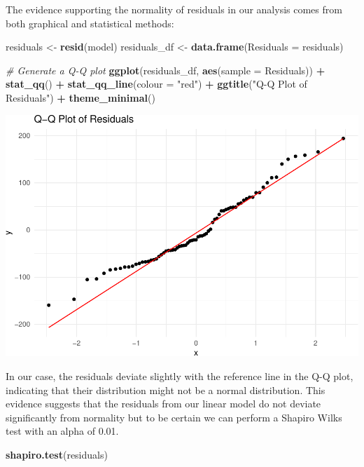 \documentclass[
]{article}
\newenvironment{Shaded}{\begin{snugshade}}{\end{snugshade}}
\newcommand{\AttributeTok}[1]{\textcolor[rgb]{0.13,0.29,0.53}{#1}}
\newcommand{\CommentTok}[1]{\textcolor[rgb]{0.56,0.35,0.01}{\textit{#1}}}
\newcommand{\FunctionTok}[1]{\textcolor[rgb]{0.13,0.29,0.53}{\textbf{#1}}}
\newcommand{\NormalTok}[1]{#1}
\newcommand{\OtherTok}[1]{\textcolor[rgb]{0.56,0.35,0.01}{#1}}
\newcommand{\SpecialCharTok}[1]{\textcolor[rgb]{0.81,0.36,0.00}{\textbf{#1}}}
\newcommand{\StringTok}[1]{\textcolor[rgb]{0.31,0.60,0.02}{#1}}
\begin{document}
The evidence supporting the normality of residuals in our analysis comes
from both graphical and statistical methods:

\begin{Shaded}
\begin{Highlighting}[]
\NormalTok{residuals }\OtherTok{\textless{}{-}} \FunctionTok{resid}\NormalTok{(model)}
\NormalTok{residuals\_df }\OtherTok{\textless{}{-}} \FunctionTok{data.frame}\NormalTok{(}\AttributeTok{Residuals =}\NormalTok{ residuals)}

\CommentTok{\# Generate a Q{-}Q plot}
\FunctionTok{ggplot}\NormalTok{(residuals\_df, }\FunctionTok{aes}\NormalTok{(}\AttributeTok{sample =}\NormalTok{ Residuals)) }\SpecialCharTok{+} \FunctionTok{stat\_qq}\NormalTok{() }\SpecialCharTok{+} \FunctionTok{stat\_qq\_line}\NormalTok{(}\AttributeTok{colour =} \StringTok{"red"}\NormalTok{) }\SpecialCharTok{+}
    \FunctionTok{ggtitle}\NormalTok{(}\StringTok{"Q{-}Q Plot of Residuals"}\NormalTok{) }\SpecialCharTok{+} \FunctionTok{theme\_minimal}\NormalTok{()}
\end{Highlighting}
\end{Shaded}

\includegraphics{602_project_files/figure-latex/unnamed-chunk-22-1.pdf}

In our case, the residuals deviate slightly with the reference line in
the Q-Q plot, indicating that their distribution might not be a normal
distribution. This evidence suggests that the residuals from our linear
model do not deviate significantly from normality but to be certain we
can perform a Shapiro Wilks test with an alpha of 0.01.

\begin{Shaded}
\begin{Highlighting}[]
\FunctionTok{shapiro.test}\NormalTok{(residuals)}
\end{Highlighting}
\end{Shaded}
\end{document}
